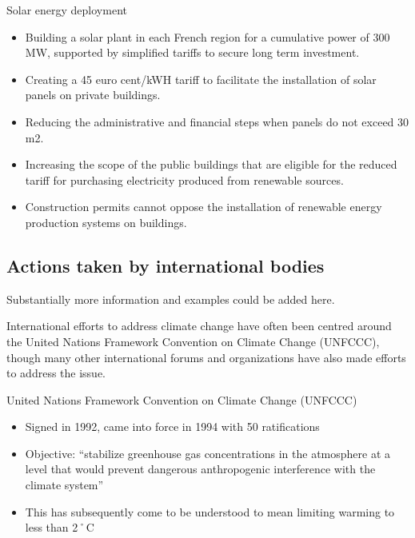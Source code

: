 Solar energy deployment
\begin{itemize}
	\item Building a solar plant in each French region for a cumulative power of 300 MW, supported by simplified tariffs to secure long term investment.
	\item Creating a 45 euro cent/kWH tariff to facilitate the installation of solar panels on private buildings.
	\item Reducing the administrative and financial steps when panels do not exceed 30 m2.
	\item Increasing the scope of the public buildings that are eligible for the reduced tariff for purchasing electricity produced from renewable sources.
	\item Construction permits cannot oppose the installation of renewable energy production systems on buildings.
\end{itemize}






		\subsection{Actions taken by international bodies}
		
		
		
\begin{vcom}
	Substantially more information and examples could be added here.
\end{vcom}



International efforts to address climate change have often been centred around the United Nations Framework Convention on Climate Change (UNFCCC), though many other international forums and organizations have also made efforts to address the issue.



United Nations Framework Convention on Climate Change (UNFCCC)
\begin{itemize}
	\item Signed in 1992, came into force in 1994 with 50 ratifications
	\item Objective: ``stabilize greenhouse gas concentrations in the atmosphere at a level that would prevent dangerous anthropogenic interference with the climate system''
	\item This has subsequently come to be understood to mean limiting warming to less than 2˚C
\end{itemize}
	


